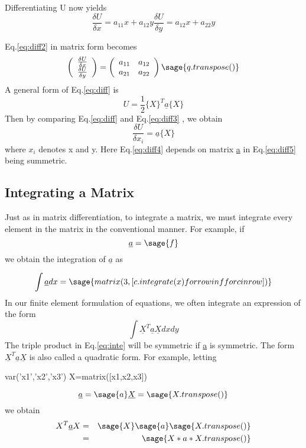 \documentclass[12pt]{report}
\newcommand{\lab}[1]{
Eq.\ref{#1}
}
\begin{document}
Differentiating U now yields 
\begin{equation} \frac{\delta U}{\delta x} = a_{{11}}x + a_{{12}}y  \frac{\delta U}{\delta y} = a_{{12}}x + a_{{22}}y \label{eq:diff2}\end{equation} 
\lab{eq:diff2} in matrix form becomes
\begin{equation}\left(\begin{array}{rr} \frac{\delta U}{\delta x} \\ \frac{\delta U}{\delta y} \\ \end{array}\right) = \left(\begin{array}{rr}a_{11} & a_{12} \\a_{21} & a_{22}\\ \end{array}\right) \sage{q.transpose()}\label{eq:diff3}\end{equation}
A general form of \lab{eq:diff} is 
\begin{equation} U = \frac{1}{2}\{X\}^T\underline{a}\{X\}\label{eq:diff5}\end{equation}
Then by comparing \lab{eq:diff} and \lab{eq:diff3}, we obtain 
\begin{equation}\frac{ \delta U}{\delta x_{i}} = \underline{a}\{X\}\label{eq:diff4}\end{equation}
where $x_{i}$ denotes x and y. Here \lab{eq:diff4} depends on matrix \underline{a} in \lab{eq:diff5}being summetric.

\subsection{Integrating a Matrix}
Just as in matrix differentiation, to integrate a matrix, we must
integrate every element in the matrix in the conventional manner. For
example, if
$$ \underline{a} = \sage{f}$$
we obtain the integration of $\underline{a}$ as

$$\int \underline{a}dx = \sage{matrix(3,[c.integrate(x) for row in f for c in row ])
}$$
In our finite element formulation of equations, we often integrate an
expression of the form
\begin{equation}\int \underline{X}^T\underline{a}\underline{X} dx dy \label{eq:inte}\end{equation}
The triple product in \lab{eq:inte} will be symmetric if \underline{a} is
symmetric. The form $\underline{X}^T\underline{a}\underline{X}$ is also called a quadratic form. For
example, letting
\begin{sagesilent}
var('x1','x2','x3')
X=matrix([x1,x2,x3])
\end{sagesilent}
$$\underline{a} = \sage{a} \underline{X}= \sage{X.transpose()}$$
we obtain
\begin{eqnarray} {X}^T\underline{a}{X} &=& \sage{X}\sage{a}\sage{X.transpose()} \nonumber\\ &=&\sage{X*a*X.transpose()} \end{eqnarray}
\end{document}
